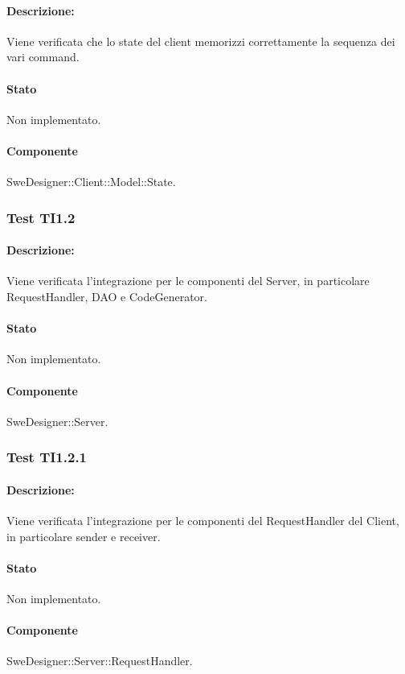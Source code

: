 \documentclass[../PianoDiQualifica.tex]{subfiles}
\begin{document}
	\paragraph{Descrizione:} Viene verificata che lo state del client memorizzi correttamente la sequenza dei vari command. 
	\paragraph{Stato} Non implementato.
	\paragraph{Componente} SweDesigner::Client::Model::State.
	
	
	
	
	\subsubsection{Test TI1.2}
	\paragraph{Descrizione:} Viene verificata l'integrazione per le componenti del Server, in particolare RequestHandler, DAO e CodeGenerator.
	\paragraph{Stato} Non implementato.
	\paragraph{Componente} SweDesigner::Server.
	
	\subsubsection{Test TI1.2.1}
	\paragraph{Descrizione:} Viene verificata l'integrazione per le componenti del RequestHandler del Client, in particolare sender e receiver.
	\paragraph{Stato} Non implementato.
	\paragraph{Componente} SweDesigner::Server::RequestHandler.
\end{document}
